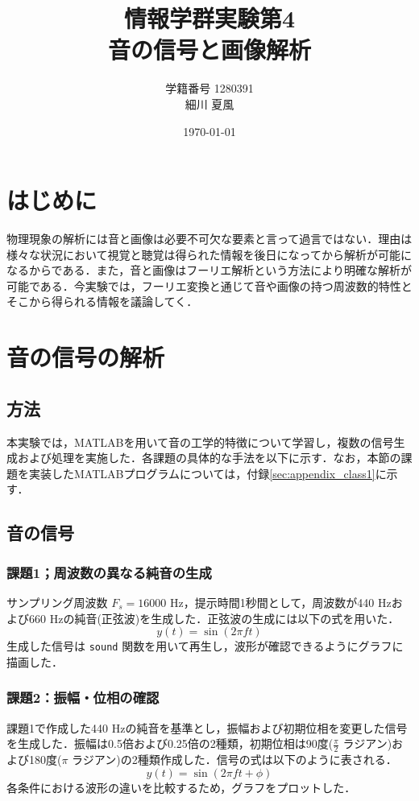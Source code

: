 \documentclass[paper=a4, fontsize=10pt]{jlreq}
\title{情報学群実験第4 \\ 音の信号と画像解析}
\author{学籍番号 1280391 \\ 細川 夏風}
\date{\today}
\begin{document}
\maketitle

\section{はじめに}
物理現象の解析には音と画像は必要不可欠な要素と言って過言ではない．理由は様々な状況において視覚と聴覚は得られた情報を後日になってから解析が可能になるからである．また，音と画像はフーリエ解析という方法により明確な解析が可能である．今実験では，フーリエ変換と通じて音や画像の持つ周波数的特性とそこから得られる情報を議論してく．

\section{音の信号の解析}

\subsection*{方法}

本実験では，MATLABを用いて音の工学的特徴について学習し，複数の信号生成および処理を実施した．各課題の具体的な手法を以下に示す．なお，本節の課題を実装したMATLABプログラムについては，付録\ref{sec:appendix_class1}に示す．

\subsection{音の信号}
\subsubsection{課題1；周波数の異なる純音の生成}
サンプリング周波数 $F_s = 16000$ Hz，提示時間1秒間として，周波数が440 Hzおよび660 Hzの純音(正弦波)を生成した．正弦波の生成には以下の式を用いた．
$$y(t)=\sin(2\pi ft)$$
生成した信号は \texttt{sound} 関数を用いて再生し，波形が確認できるようにグラフに描画した．

\subsubsection{課題2：振幅・位相の確認}
課題1で作成した440 Hzの純音を基準とし，振幅および初期位相を変更した信号を生成した．振幅は0.5倍および0.25倍の2種類，初期位相は90度($\frac{\pi}{2}$ ラジアン)および180度($\pi$ ラジアン)の2種類作成した．信号の式は以下のように表される．
$$y(t)=\sin(2\pi ft+\phi)$$
各条件における波形の違いを比較するため，グラフをプロットした．
\end{document}

